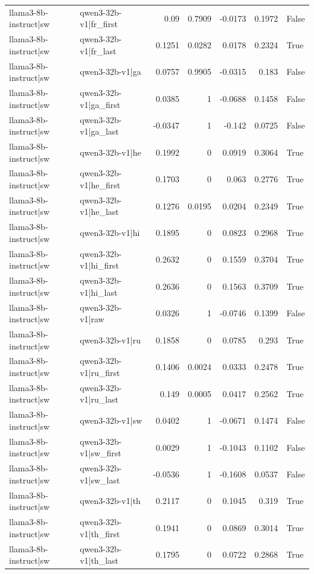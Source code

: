 \begin{table}
\begin{tabular}{l l r r r r l}
llama3-8b-instruct|sw & qwen3-32b-v1|fr_first & 0.09 & 0.7909 & -0.0173 & 0.1972 & False \\
llama3-8b-instruct|sw & qwen3-32b-v1|fr_last & 0.1251 & 0.0282 & 0.0178 & 0.2324 & True \\
llama3-8b-instruct|sw & qwen3-32b-v1|ga & 0.0757 & 0.9905 & -0.0315 & 0.183 & False \\
llama3-8b-instruct|sw & qwen3-32b-v1|ga_first & 0.0385 & 1 & -0.0688 & 0.1458 & False \\
llama3-8b-instruct|sw & qwen3-32b-v1|ga_last & -0.0347 & 1 & -0.142 & 0.0725 & False \\
llama3-8b-instruct|sw & qwen3-32b-v1|he & 0.1992 & 0 & 0.0919 & 0.3064 & True \\
llama3-8b-instruct|sw & qwen3-32b-v1|he_first & 0.1703 & 0 & 0.063 & 0.2776 & True \\
llama3-8b-instruct|sw & qwen3-32b-v1|he_last & 0.1276 & 0.0195 & 0.0204 & 0.2349 & True \\
llama3-8b-instruct|sw & qwen3-32b-v1|hi & 0.1895 & 0 & 0.0823 & 0.2968 & True \\
llama3-8b-instruct|sw & qwen3-32b-v1|hi_first & 0.2632 & 0 & 0.1559 & 0.3704 & True \\
llama3-8b-instruct|sw & qwen3-32b-v1|hi_last & 0.2636 & 0 & 0.1563 & 0.3709 & True \\
llama3-8b-instruct|sw & qwen3-32b-v1|raw & 0.0326 & 1 & -0.0746 & 0.1399 & False \\
llama3-8b-instruct|sw & qwen3-32b-v1|ru & 0.1858 & 0 & 0.0785 & 0.293 & True \\
llama3-8b-instruct|sw & qwen3-32b-v1|ru_first & 0.1406 & 0.0024 & 0.0333 & 0.2478 & True \\
llama3-8b-instruct|sw & qwen3-32b-v1|ru_last & 0.149 & 0.0005 & 0.0417 & 0.2562 & True \\
llama3-8b-instruct|sw & qwen3-32b-v1|sw & 0.0402 & 1 & -0.0671 & 0.1474 & False \\
llama3-8b-instruct|sw & qwen3-32b-v1|sw_first & 0.0029 & 1 & -0.1043 & 0.1102 & False \\
llama3-8b-instruct|sw & qwen3-32b-v1|sw_last & -0.0536 & 1 & -0.1608 & 0.0537 & False \\
llama3-8b-instruct|sw & qwen3-32b-v1|th & 0.2117 & 0 & 0.1045 & 0.319 & True \\
llama3-8b-instruct|sw & qwen3-32b-v1|th_first & 0.1941 & 0 & 0.0869 & 0.3014 & True \\
llama3-8b-instruct|sw & qwen3-32b-v1|th_last & 0.1795 & 0 & 0.0722 & 0.2868 & True \\

\end{tabular}
\end{table}
